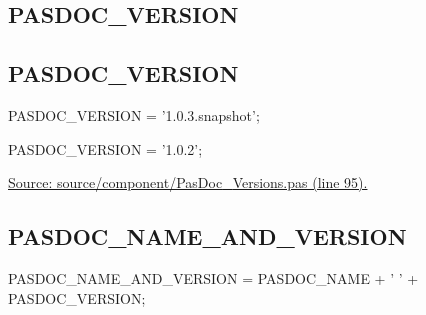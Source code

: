 \documentclass{report}
\newif\ifpdf
\begin{document}
\subsection*{\large{\textbf{PASDOC{\_}VERSION}}\normalsize\hspace{1ex}\hrulefill}
\else
\subsection*{PASDOC{\_}VERSION}
\fi
\label{PasDoc_Versions-PASDOC_VERSION}
\begin{list}{}{
\setlength{\itemindent}{0cm}
\setlength{\listparindent}{0cm}
\setlength{\leftmargin}{\evensidemargin}
\addtolength{\leftmargin}{\tmplength}
\settowidth{\labelsep}{X}
\addtolength{\leftmargin}{\labelsep}
\setlength{\labelwidth}{\tmplength}
}
\item[\textbf{Declaration}\hfill]
\ifpdf
\begin{flushleft}
\fi
\begin{ttfamily}
PASDOC{\_}VERSION = '1.0.3.snapshot';\end{ttfamily}

\ifpdf
\end{flushleft}
\fi

\par
\item[\textbf{Description}]
PASDOC{\_}VERSION = '1.0.2';\par
\href{https://github.com/pasdoc/pasdoc/blob/master/source/component/PasDoc_Versions.pas#L95}{Source: source/component/PasDoc{\_}Versions.pas (line 95).}

\end{list}
\ifpdf
\subsection*{\large{\textbf{PASDOC{\_}NAME{\_}AND{\_}VERSION}}\normalsize\hspace{1ex}\hrulefill}
\else
\subsection*{PASDOC{\_}NAME{\_}AND{\_}VERSION}
\fi
\label{PasDoc_Versions-PASDOC_NAME_AND_VERSION}
\begin{list}{}{
\setlength{\itemindent}{0cm}
\setlength{\listparindent}{0cm}
\setlength{\leftmargin}{\evensidemargin}
\addtolength{\leftmargin}{\tmplength}
\settowidth{\labelsep}{X}
\addtolength{\leftmargin}{\labelsep}
\setlength{\labelwidth}{\tmplength}
}
\item[\textbf{Declaration}\hfill]
\ifpdf
\begin{flushleft}
\fi
\begin{ttfamily}
PASDOC{\_}NAME{\_}AND{\_}VERSION = PASDOC{\_}NAME + ' ' + PASDOC{\_}VERSION;\end{ttfamily}

\ifpdf
\end{flushleft}
\fi

\end{list}
\ifpdf
\end{document}
